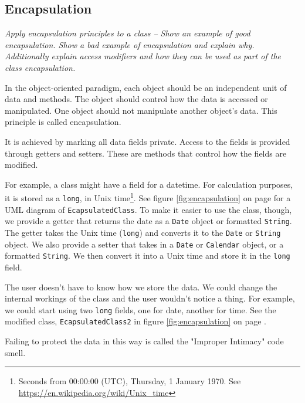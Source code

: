 \subsection{Encapsulation}
\textit{Apply encapsulation principles to a class -- Show an example of good encapsulation.  Show a bad example of encapsulation and explain why.  Additionally explain access modifiers and how they can be used as part of the class encapsulation.}

In the object-oriented paradigm, each object should be an independent unit of data and methods. The object should control how the data is accessed or manipulated. One object should not manipulate another object's data. This principle is called encapsulation.

It is achieved by marking all data fields private. Access to the fields is provided through getters and setters. These are methods that control how the fields are modified. 

For example, a class might have a field for a datetime. For calculation purposes, it is stored as a \texttt{long}, in Unix time\footnote{Seconds from 00:00:00 (UTC), Thursday, 1 January 1970. See \url{https://en.wikipedia.org/wiki/Unix_time}}. See figure \ref{fig:encapsulation} on page \pageref{fig:encapsulation} for a UML diagram of \texttt{EcapsulatedClass}. To make it easier to use the class, though, we provide a getter that returns the date as a \texttt{Date} object or formatted \texttt{String}. The getter takes the Unix time (\texttt{long}) and converts it to the \texttt{Date} or \texttt{String} object. We also provide a setter that takes in a \texttt{Date} or \texttt{Calendar} object, or a formatted \texttt{String}. We then convert it into a Unix time and store it in the \texttt{long} field. 

The user doesn't have to know how we store the data. We could change the internal workings of the class and the user wouldn't notice a thing. For example, we could start using two \texttt{long} fields, one for date, another for time. See the modified class, \texttt{EcapsulatedClass2} in figure \ref{fig:encapsulation} on page \pageref{fig:encapsulation}.

Failing to protect the data in this way is called the "Improper Intimacy" code smell\cite{codesmells}.

